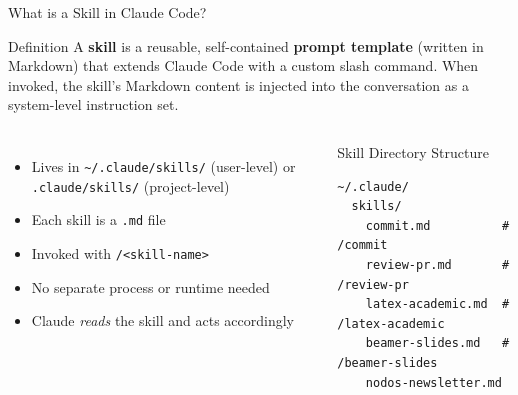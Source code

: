 \documentclass[aspectratio=169,xcolor=dvipsnames]{beamer}
\begin{document}
\begin{frame}[fragile]{What is a Skill in Claude Code?}
    \begin{block}{Definition}
        A \textbf{skill} is a reusable, self-contained \textbf{prompt template} (written in Markdown) that extends Claude Code with a custom slash command. When invoked, the skill's Markdown content is injected into the conversation as a system-level instruction set.
    \end{block}

    \begin{columns}
        \begin{itemize}
            \item Lives in \texttt{\textasciitilde/.claude/skills/} (user-level) or \texttt{.claude/skills/} (project-level)
            \item Each skill is a \texttt{.md} file
            \item Invoked with \texttt{/<skill-name>}
            \item No separate process or runtime needed
            \item Claude \emph{reads} the skill and acts accordingly
        \end{itemize}

        \begin{exampleblock}{Skill Directory Structure}
                        \begin{lstlisting}[style=BashStyle]
~/.claude/
  skills/
    commit.md          # /commit
    review-pr.md       # /review-pr
    latex-academic.md  # /latex-academic
    beamer-slides.md   # /beamer-slides
    nodos-newsletter.md
            \end{lstlisting}
        \end{exampleblock}
    \end{columns}
\end{frame}
\end{document}
